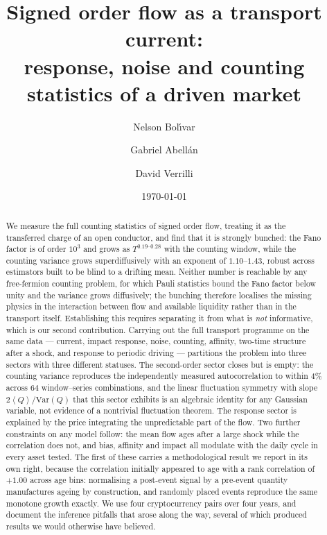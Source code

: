 \documentclass[aps,pre,twocolumn,superscriptaddress,floatfix,nofootinbib]{revtex4-2}
\newcommand{\avg}[1]{\left\langle #1 \right\rangle}
\newcommand{\Var}{\mathrm{Var}}
\begin{document}
\title{Signed order flow as a transport current:\\
response, noise and counting statistics of a driven market}

\author{Nelson Bol\'{\i}var}
\author{Gabriel Abell\'an}
\author{David Verrilli}

\date{\today}

\begin{abstract}
We measure the full counting statistics of signed order flow, treating it as
the transferred charge of an open conductor, and find that it is strongly
bunched: the Fano factor is of order $10^{3}$ and grows as
$T^{0.19\text{--}0.28}$ with the counting window, while the counting variance
grows superdiffusively with an exponent of $1.10$--$1.43$, robust across
estimators built to be blind to a drifting mean.
Neither number is reachable by any free-fermion counting problem, for which
Pauli statistics bound the Fano factor below unity and the variance grows
diffusively; the bunching therefore localises the missing physics in the
interaction between flow and available liquidity rather than in the transport
itself. Establishing this requires separating it from what is \emph{not}
informative, which is our second contribution. Carrying out the full transport
programme on the same data --- current, impact response, noise, counting,
affinity, two-time structure after a shock, and response to periodic driving ---
partitions the problem into three sectors with three different statuses. The
second-order sector closes but is empty: the counting variance reproduces the
independently measured autocorrelation to within $4\%$ across $64$
window--series combinations, and the linear fluctuation symmetry with slope
$2\avg{Q}/\Var(Q)$ that this sector exhibits is an algebraic identity for any
Gaussian variable, not evidence of a nontrivial fluctuation theorem. The
response sector is explained by the price integrating the unpredictable part of
the flow. Two further constraints on any model follow: the mean flow ages after
a large shock while the correlation does not, and bias, affinity and impact all
modulate with the daily cycle in every asset tested. The first of these carries
a methodological result we report in its own right, because the correlation
initially appeared to age with a rank correlation of $+1.00$ across age bins:
normalising a post-event signal by a pre-event quantity manufactures ageing by
construction, and randomly placed events reproduce the same monotone growth
exactly. We use four cryptocurrency pairs over four years, and document the
inference pitfalls that arose along the way, several of which produced results
we would otherwise have believed.
\end{abstract}
\end{document}
